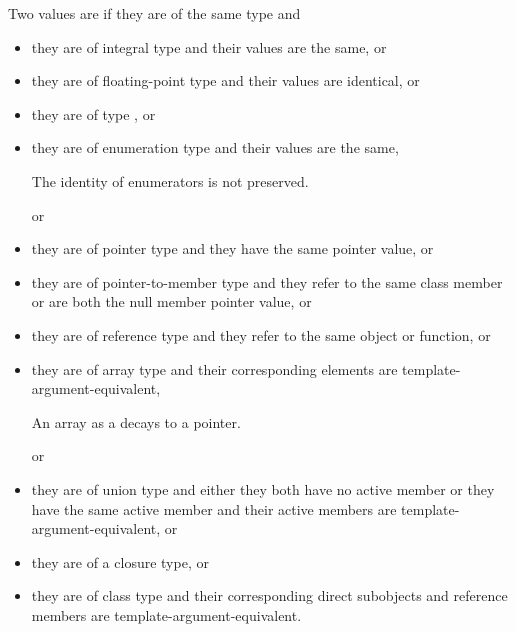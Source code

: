 \pnum
Two values are  if
they are of the same type and
\begin{itemize}
\item
they are of integral type and their values are the same, or

\item
they are of floating-point type and their values are identical, or

\item
they are of type , or

\item
they are of enumeration type and their values are the same,
\begin{footnote}
The identity of enumerators is not preserved.
\end{footnote}
or

\item
they are of pointer type and they have the same pointer value, or

\item
they are of pointer-to-member type and they refer to the same class member
or are both the null member pointer value, or

\item
they are of reference type and they refer to the same object or function, or

\item
they are of array type and their corresponding elements are template-argument-equivalent,
\begin{footnote}
An array as a  decays to a pointer.
\end{footnote}
or

\item
they are of union type and either
they both have no active member or
they have the same active member and their active members are template-argument-equivalent, or

\item
they are of a closure type, or

\item
they are of class type and
their corresponding direct subobjects and reference members are template-argument-equivalent.
\end{itemize}

